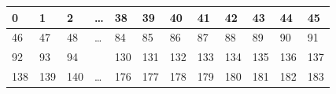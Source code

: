 \begin{table}[]
    \begin{tabular}{llllllllllll}
    \hline
    \multicolumn{1}{|l|}{0}                           & \multicolumn{1}{l|}{1}                           & \multicolumn{1}{l|}{2}                           & \multicolumn{1}{l|}{…}                         & \multicolumn{1}{l|}{38}                          & \multicolumn{1}{l|}{39}                          & \multicolumn{1}{l|}{40}                          & \multicolumn{1}{l|}{41}                          & \multicolumn{1}{l|}{42}                          & \multicolumn{1}{l|}{43}                          & \multicolumn{1}{l|}{44}                          & \multicolumn{1}{l|}{45}                          \\ \hline
    \multicolumn{1}{|l|}{46}                          & \multicolumn{1}{l|}{47}                          & \multicolumn{1}{l|}{48}                          & \multicolumn{1}{l|}{…}                         & \multicolumn{1}{l|}{84}                          & \multicolumn{1}{l|}{85}                          & \multicolumn{1}{l|}{86}                          & \multicolumn{1}{l|}{87}                          & \multicolumn{1}{l|}{88}                          & \multicolumn{1}{l|}{89}                          & \multicolumn{1}{l|}{90}                          & \multicolumn{1}{l|}{91}                          \\ \hline
    \multicolumn{1}{|l|}{92}                          & \multicolumn{1}{l|}{93}                          & \multicolumn{1}{l|}{94}                          & \multicolumn{1}{l|}{}                          & \multicolumn{1}{l|}{130}                         & \multicolumn{1}{l|}{131}                         & \multicolumn{1}{l|}{132}                         & \multicolumn{1}{l|}{133}                         & \multicolumn{1}{l|}{\cellcolor[HTML]{FFFFC7}134} & \multicolumn{1}{l|}{135}                         & \multicolumn{1}{l|}{136}                         & \multicolumn{1}{l|}{137}                         \\ \hline
    \multicolumn{1}{|l|}{\cellcolor[HTML]{F8FF00}138} & \multicolumn{1}{l|}{139}                         & \multicolumn{1}{l|}{140}                         & \multicolumn{1}{l|}{…}                         & \multicolumn{1}{l|}{176}                         & \multicolumn{1}{l|}{177}                         & \multicolumn{1}{l|}{178}                         & \multicolumn{1}{l|}{179}                         & \multicolumn{1}{l|}{\cellcolor[HTML]{FFFFC7}180} & \multicolumn{1}{l|}{181}                         & \multicolumn{1}{l|}{182}                         & \multicolumn{1}{l|}{183}                         \\ \hline

\end{tabular}
\end{table}
